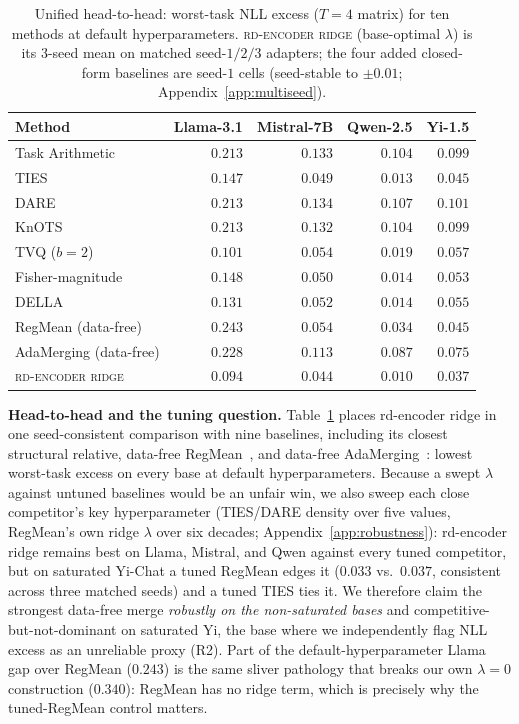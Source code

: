 \begin{table}[t]
\centering
\caption{Unified head-to-head: worst-task NLL excess ($T = 4$ matrix)
for ten methods at default hyperparameters. \textsc{rd-encoder ridge}
(base-optimal $\lambda$) is its $3$-seed mean on matched seed-$1/2/3$
adapters; the four added closed-form baselines are seed-$1$ cells
(seed-stable to $\pm 0.01$; Appendix~\ref{app:multiseed}).}
\label{tab:e10-baselines}
\small
\begin{tabular}{lrrrr}
\hline
Method & Llama-3.1 & Mistral-7B & Qwen-2.5 & Yi-1.5 \\
\hline
Task Arithmetic           & $0.213$ & $0.133$ & $0.104$ & $0.099$ \\
TIES                      & $0.147$ & $0.049$ & $0.013$ & $0.045$ \\
DARE                      & $0.213$ & $0.134$ & $0.107$ & $0.101$ \\
KnOTS                     & $0.213$ & $0.132$ & $0.104$ & $0.099$ \\
TVQ ($b{=}2$)             & $0.101$ & $0.054$ & $0.019$ & $0.057$ \\
Fisher-magnitude          & $0.148$ & $0.050$ & $0.014$ & $0.053$ \\
DELLA                     & $0.131$ & $0.052$ & $0.014$ & $0.055$ \\
RegMean (data-free)       & $0.243$ & $0.054$ & $0.034$ & $0.045$ \\
AdaMerging (data-free)    & $0.228$ & $0.113$ & $0.087$ & $0.075$ \\
\textsc{rd-encoder ridge} & $\mathbf{0.094}$ & $\mathbf{0.044}$ & $\mathbf{0.010}$ & $\mathbf{0.037}$ \\
\hline
\end{tabular}
\end{table}

\textbf{Head-to-head and the tuning question.}
Table~\ref{tab:e10-baselines} places rd-encoder ridge in one
seed-consistent comparison with nine baselines, including its closest
structural relative, data-free RegMean~\citep{jin2023regmean}, and
data-free AdaMerging~\citep{adamerging2024}: lowest worst-task excess
on every base at default hyperparameters. Because a swept $\lambda$
against untuned baselines would be an unfair win, we also sweep each
close competitor's key hyperparameter (TIES/DARE density over five
values, RegMean's own ridge $\lambda$ over six decades;
Appendix~\ref{app:robustness}): rd-encoder ridge remains best on
Llama, Mistral, and Qwen against every tuned competitor, but on
saturated Yi-Chat a tuned RegMean edges it ($0.033$ vs.\ $0.037$,
consistent across three matched seeds) and a tuned TIES ties it. We
therefore claim the strongest data-free merge \emph{robustly on the
non-saturated bases} and competitive-but-not-dominant on saturated
Yi, the base where we independently flag NLL excess as an unreliable
proxy (R2). Part of the default-hyperparameter
Llama gap over RegMean ($0.243$) is the same sliver pathology that
breaks our own $\lambda = 0$ construction ($0.340$): RegMean has no
ridge term, which is precisely why the tuned-RegMean control matters.

